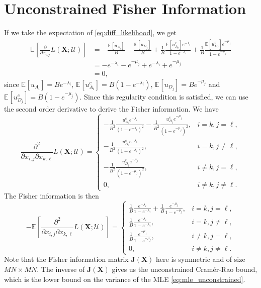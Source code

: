 \documentclass[12pt]{article}
\numberwithin{equation}{section}
\numberwithin{table}{section}
\numberwithin{figure}{section}
\newcommand{\be}{\begin{equation}}
\newcommand{\ee}{\end{equation}}
\newcommand{\ben}{\begin{equation*}}
\newcommand{\een}{\end{equation*}}
\newcommand{\E}[2][]{\mathbb E_{#1} \!\left[ #2 \right]} %
\def\bJ{\mathbf{J}}
\def\bX{\mathbf{X}}
\def\cU{\mathcal{U}}
\begin{document}
\section{Unconstrained Fisher Information}

If we take the expectation of \autoref{eq:diff_likelihood}, we get
\begin{align*}
\E{\frac{\partial}{\partial x_{i,j}} L(\bX ; \cU)} &= - \frac{\E{u_{A_i}}}{B} - \frac{\E{u_{D_j}}}{B} + \frac{1}{B} \frac{\E{u^c_{A_i}} e^{-\lambda_i}}{1-e^{-\lambda_i}}
+ \frac{1}{B} \frac{\E{u^c_{D_j}} e^{-\mu_j}}{1-e^{-\mu_j}}\\
&= - e^{-\lambda_i} - e^{-\mu_j} + e^{-\lambda_i} + e^{-\mu_j} \\
&= 0,
\end{align*}
since $\E{u_{A_i}} = Be^{-\lambda_i}$, $\E{u^c_{A_i}} = B(1-e^{-\lambda_i})$, $\E{u_{D_j}} = Be^{-\mu_j}$ and $\E{u^c_{D_j}} 
= B(1-e^{-\mu_j})$. Since this regularity condition is satisfied, we can use the second order derivative to derive the Fisher information. We have
\ben
\frac{\partial^2}{\partial x_{i,j}\partial x_{k,\ell}} L(\bX ; \cU) =
\begin{cases}
-\frac{1}{B^2} \frac{u^c_{A_i} e^{-\lambda_i}}{(1-e^{-\lambda_i})^2} - \frac{1}{B^2} \frac{u^c_{D_j} e^{-\mu_j}}{(1-e^{-\mu_j})^2}, & i=k, j=\ell,\\
-\frac{1}{B^2} \frac{u^c_{A_i} e^{-\lambda_i}}{(1-e^{-\lambda_i})^2}, & i=k, j \ne \ell,\\
-\frac{1}{B^2} \frac{u^c_{D_j} e^{-\mu_j}}{(1-e^{-\mu_j})^2}, & i \ne k, j = \ell,\\
0, & i\ne k, j\ne \ell.
\end{cases}
\een
The Fisher information is then
\be
-\E{\frac{\partial^2}{\partial x_{i,j}\partial x_{k,\ell}} L(\bX ; \cU) } =
\begin{cases}
\frac{1}{B} \frac{e^{-\lambda_i}}{1-e^{-\lambda_i}} + \frac{1}{B} \frac{e^{-\mu_j}}{1-e^{-\mu_j}}, & i=k, j=\ell,\\
\frac{1}{B} \frac{e^{-\lambda_i}}{1-e^{-\lambda_i}}, & i=k, j \ne \ell,\\
\frac{1}{B} \frac{ e^{-\mu_j}}{1-e^{-\mu_j}}, & i \ne k, j = \ell,\\
0, & i\ne k, j\ne \ell.
\end{cases}
\label{eq:fim_no_constraints}
\ee
Note that the Fisher information matrix $\bJ(\bX)$ here is symmetric and of size $MN \times MN$. The inverse of $\bJ(\bX)$ gives us the
unconstrained Cram\'er-Rao bound, which is the lower bound on the variance of the MLE \autoref{eq:mle_unconstrained}.
\end{document}
